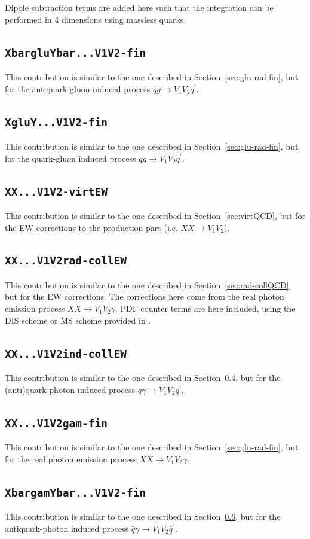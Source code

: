 \documentclass[english,12pt]{article}
\newcommand{\sect}[1]{Section~\ref{#1}}
\begin{document}
Dipole subtraction terms \cite{Dittmaier:1999mb} are added here such that the integration can be performed in 4 dimensions using 
massless quarks. 
\subsection{\tt XbargluYbar...V1V2-fin}
\label{sec:Qbarglu-ind-fin}
This contribution is similar to the one described in \sect{sec:glu-rad-fin}, but for the 
antiquark-gluon induced process $\bar{q}g \to V_1 V_2 \bar{q}^\prime$. 
\subsection{\tt XgluY...V1V2-fin}
\label{sec:Qglu-ind-fin}
This contribution is similar to the one described in \sect{sec:glu-rad-fin}, but for the 
quark-gluon induced process $qg \to V_1 V_2 q^\prime$. 
\subsection{\tt XX...V1V2-virtEW}
\label{sec:virtEW}
This contribution is similar to the one described in \sect{sec:virtQCD}, but for the 
EW corrections to the production part (i.e. $XX \to V_1 V_2$). 
\subsection{\tt XX...V1V2rad-collEW}
\label{sec:rad-collEW}
This contribution is similar to the one described in \sect{sec:rad-collQCD}, but for the 
EW corrections. 
The corrections here come from the real photon emission process 
$XX \to V_1 V_2 \gamma$.
PDF counter terms are here included, using the DIS scheme or $\overline{\text{MS}}$ scheme provided in \cite{Dittmaier:2009cr}. 
\subsection{\tt XX...V1V2ind-collEW}
\label{sec:ind-collEW}
This contribution is similar to the one described in \sect{sec:rad-collEW}, but for the 
(anti)quark-photon induced process $q\gamma \to V_1 V_2 q^\prime$.
\subsection{\tt XX...V1V2gam-fin}
\label{sec:gam-rad-fin}
This contribution is similar to the one described in \sect{sec:glu-rad-fin}, but for the 
real photon emission process $XX \to V_1 V_2 \gamma$.
\subsection{\tt XbargamYbar...V1V2-fin}
\label{sec:Qbargam-ind-fin}
This contribution is similar to the one described in \sect{sec:gam-rad-fin}, but for the 
antiquark-photon induced process $\bar{q}\gamma \to V_1 V_2 \bar{q}^\prime$.
\end{document}

